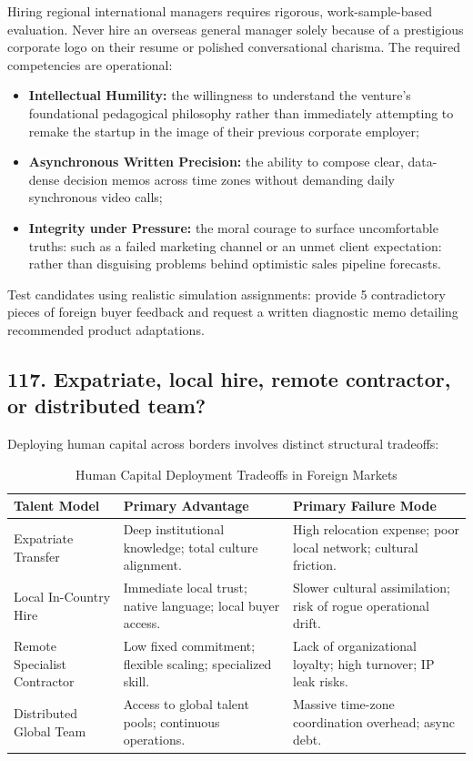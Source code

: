 Hiring regional international managers requires rigorous, work-sample-based evaluation. Never hire an overseas general manager solely because of a prestigious corporate logo on their resume or polished conversational charisma. The required competencies are operational:
\begin{itemize}
    \item \textbf{Intellectual Humility:} the willingness to understand the venture's foundational pedagogical philosophy rather than immediately attempting to remake the startup in the image of their previous corporate employer;
    \item \textbf{Asynchronous Written Precision:} the ability to compose clear, data-dense decision memos across time zones without demanding daily synchronous video calls;
    \item \textbf{Integrity under Pressure:} the moral courage to surface uncomfortable truths: such as a failed marketing channel or an unmet client expectation: rather than disguising problems behind optimistic sales pipeline forecasts.
\end{itemize}
Test candidates using realistic simulation assignments: provide 5 contradictory pieces of foreign buyer feedback and request a written diagnostic memo detailing recommended product adaptations.

\subsection{117. Expatriate, local hire, remote contractor, or distributed team?}

Deploying human capital across borders involves distinct structural tradeoffs:

\begin{table}[htbp]
\centering
\small
\caption{Human Capital Deployment Tradeoffs in Foreign Markets}
\label{tab:talent_tradeoffs}
\begin{tabularx}{\columnwidth}{p{2.2cm} p{2.4cm} X}
\toprule
\textbf{Talent Model} & \textbf{Primary Advantage} & \textbf{Primary Failure Mode} \\
\midrule
Expatriate Transfer & Deep institutional knowledge; total culture alignment. & High relocation expense; poor local network; cultural friction. \\
Local In-Country Hire & Immediate local trust; native language; local buyer access. & Slower cultural assimilation; risk of rogue operational drift. \\
Remote Specialist Contractor & Low fixed commitment; flexible scaling; specialized skill. & Lack of organizational loyalty; high turnover; IP leak risks. \\
Distributed Global Team & Access to global talent pools; continuous operations. & Massive time-zone coordination overhead; async debt. \\
\bottomrule
\end{tabularx}
\end{table}

